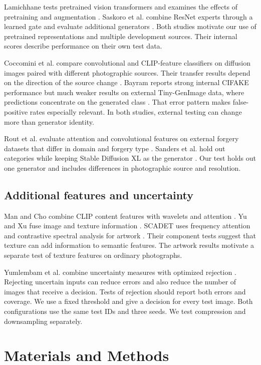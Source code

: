 \documentclass[11pt,a4paper]{article}
\begin{document}
Lamichhane tests pretrained vision transformers and examines the effects of pretraining and augmentation \cite{r23}. Saskoro et al. combine ResNet experts through a learned gate and evaluate additional generators \cite{r24}. Both studies motivate our use of pretrained representations and multiple development sources. Their internal scores describe performance on their own test data.

Coccomini et al. compare convolutional and CLIP-feature classifiers on diffusion images paired with different photographic sources. Their transfer results depend on the direction of the source change \cite{r25}. Bayram reports strong internal CIFAKE performance but much weaker results on external Tiny-GenImage data, where predictions concentrate on the generated class \cite{r26}. That error pattern makes false-positive rates especially relevant. In both studies, external testing can change more than generator identity.

Rout et al. evaluate attention and convolutional features on external forgery datasets that differ in domain and forgery type \cite{r27}. Sanders et al. hold out categories while keeping Stable Diffusion XL as the generator \cite{r28}. Our test holds out one generator and includes differences in photographic source and resolution.


\subsection{Additional features and uncertainty}


Man and Cho combine CLIP content features with wavelets and attention \cite{r29}. Yu and Xu fuse image and texture information \cite{r30}. SCADET uses frequency attention and contrastive spectral analysis for artwork \cite{r31}. Their component tests suggest that texture can add information to semantic features. The artwork results motivate a separate test of texture features on ordinary photographs.

Yumlembam et al. combine uncertainty measures with optimized rejection \cite{r32}. Rejecting uncertain inputs can reduce errors and also reduce the number of images that receive a decision. Tests of rejection should report both errors and coverage. We use a fixed threshold and give a decision for every test image. Both configurations use the same test IDs and three seeds. We test compression and downsampling separately.

\section{Materials and Methods}
\end{document}
